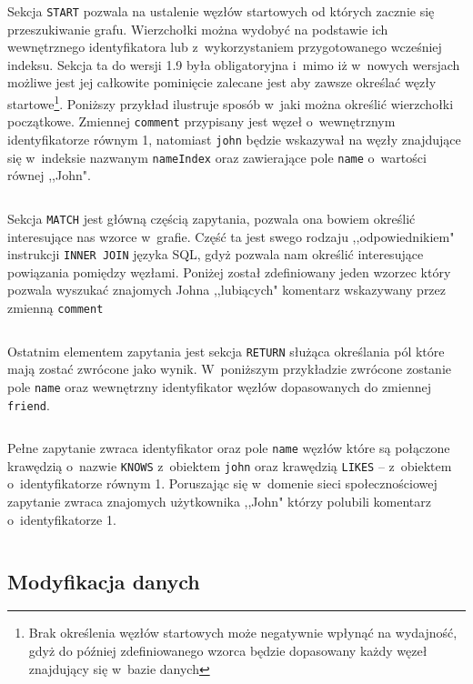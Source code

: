 \documentclass{xmgr}
\begin{document}
Sekcja \texttt{START} pozwala na ustalenie węzłów startowych od których zacznie się przeszukiwanie grafu. Wierzchołki można wydobyć na podstawie ich wewnętrznego identyfikatora lub z~wykorzystaniem przygotowanego wcześniej indeksu. Sekcja ta do wersji 1.9 była obligatoryjna i~mimo iż w~nowych wersjach możliwe jest jej całkowite pominięcie zalecane jest aby zawsze określać węzły startowe\footnote{Brak określenia węzłów startowych może negatywnie wpłynąć na wydajność, gdyż do później zdefiniowanego wzorca będzie dopasowany każdy węzeł znajdujący się w~bazie danych}. Poniższy przykład ilustruje sposób w~jaki można określić wierzchołki początkowe. Zmiennej \texttt{comment} przypisany jest węzeł o~wewnętrznym identyfikatorze równym 1, natomiast \texttt{john} będzie wskazywał na węzły znajdujące się w~indeksie nazwanym \texttt{nameIndex} oraz zawierające pole \texttt{name} o~wartości równej ,,John".

\inputminted{cypher}{listings/cypher/start-section.cypher}

Sekcja \texttt{MATCH} jest główną częścią zapytania, pozwala ona bowiem określić interesujące nas wzorce w~grafie. Część ta jest swego rodzaju ,,odpowiednikiem" instrukcji \texttt{INNER JOIN} języka SQL, gdyż pozwala nam określić interesujące powiązania pomiędzy węzłami. Poniżej został zdefiniowany jeden wzorzec który pozwala wyszukać znajomych Johna ,,lubiących" komentarz wskazywany przez zmienną \texttt{comment}

\inputminted{cypher}{listings/cypher/match-section.cypher}

Ostatnim elementem zapytania jest sekcja \texttt{RETURN} służąca określania pól które mają zostać zwrócone jako wynik. W~poniższym przykładzie zwrócone zostanie pole \texttt{name} oraz wewnętrzny identyfikator węzłów dopasowanych do zmiennej \texttt{friend}.

\inputminted{cypher}{listings/cypher/return-section.cypher}

Pełne zapytanie zwraca identyfikator oraz pole \texttt{name} węzłów które są połączone krawędzią o~nazwie \texttt{KNOWS} z~obiektem \texttt{john} oraz krawędzią \texttt{LIKES} -- z~obiektem o~identyfikatorze równym {1}. Poruszając się w~domenie sieci społecznościowej zapytanie zwraca znajomych użytkownika ,,John" którzy polubili komentarz o~identyfikatorze {1}.

\inputminted{cypher}{listings/cypher/sample-query.cypher}

\subsection{Modyfikacja danych}
\end{document}
